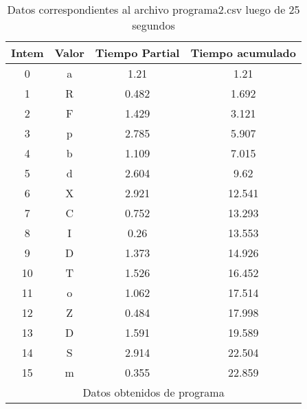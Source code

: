 \begin{table}[ht!]
\center

\caption{Datos correspondientes al archivo programa2.csv luego de 25 segundos}
\label{tab:programa2}
\begin{tabular}{|c|c|c|c|}
\toprule
Intem & Valor & Tiempo Partial & Tiempo acumulado \\
\midrule
0 & a & 1.21 & 1.21 \\
1 & R & 0.482 & 1.692 \\
2 & F & 1.429 & 3.121 \\
3 & p & 2.785 & 5.907 \\
4 & b & 1.109 & 7.015 \\
5 & d & 2.604 & 9.62 \\
6 & X & 2.921 & 12.541 \\
7 & C & 0.752 & 13.293 \\
8 & I & 0.26 & 13.553 \\
9 & D & 1.373 & 14.926 \\
10 & T & 1.526 & 16.452 \\
11 & o & 1.062 & 17.514 \\
12 & Z & 0.484 & 17.998 \\
13 & D & 1.591 & 19.589 \\
14 & S & 2.914 & 22.504 \\
15 & m & 0.355 & 22.859 \\
\hline \multicolumn{4}{|c|}{Datos obtenidos de programa} \\


\bottomrule
\end{tabular}
\end{table}
